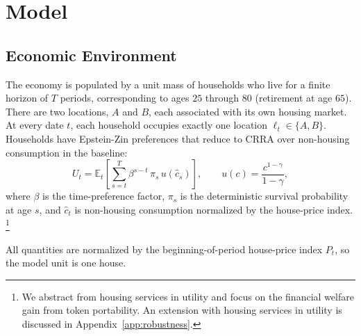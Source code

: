 %
%
%

\section{Model}
\label{sec:model}

\subsection{Economic Environment}
\label{sec:model:environment}

The economy is populated by a unit mass of households who live for a
finite horizon of $T$ periods, corresponding to ages $25$ through $80$
(retirement at age $65$).
There are two locations, $A$ and $B$, each associated with its own housing
market.
At every date $t$, each household occupies exactly one location
$\ell_t \in \{A, B\}$.
Households have Epstein-Zin preferences that reduce to CRRA over
non-housing consumption in the baseline:
\begin{equation}
    U_t = \mathbb{E}_t\!\left[
        \sum_{s=t}^{T} \beta^{s-t}\,\pi_s\,
        u\!\left(\hat{c}_s\right)
    \right],
    \qquad
    u(c) = \frac{c^{1-\gamma}}{1-\gamma},
    \label{eq:utility}
\end{equation}
where $\beta$ is the time-preference factor, $\pi_s$ is the deterministic
survival probability at age $s$, and $\hat{c}_t$ is non-housing consumption
normalized by the house-price index.%
\footnote{We abstract from housing services in utility and focus on the
financial welfare gain from token portability. An extension with housing
services in utility is discussed in Appendix~\ref{app:robustness}.}

All quantities are normalized by the beginning-of-period house-price index
$P_t$, so the model unit is one house.

